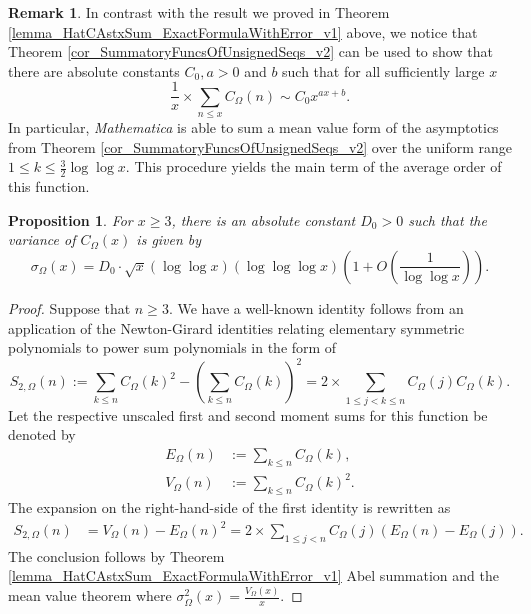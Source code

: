 \documentclass[11pt,reqno,a4letter]{article}
\newcommand{\hlocalref}[1]{\hyperref[#1]{\ref{#1}}}
\numberwithin{equation}{section}
\numberwithin{figure}{section}
\numberwithin{table}{section}
\theoremstyle{plain}
\newtheorem{prop}[theorem]{Proposition}
\numberwithin{theorem}{section}
\theoremstyle{definition}
\newtheorem{remark}[theorem]{Remark}
\begin{document}
\begin{remark}
In contrast with the result we proved in 
Theorem \hlocalref{lemma_HatCAstxSum_ExactFormulaWithError_v1} above, 
we notice that 
Theorem \hlocalref{cor_SummatoryFuncsOfUnsignedSeqs_v2} can be used to show that there are 
absolute constants $C_0,a > 0$ and $b$ such that for all sufficiently large $x$ 
\[
\frac{1}{x} \times \sum_{n \leq x} C_{\Omega}(n) \sim C_0 x^{ax+b}. 
\]
In particular, \emph{Mathematica} is able to sum a mean value form of the 
asymptotics from Theorem \hlocalref{cor_SummatoryFuncsOfUnsignedSeqs_v2} 
over the uniform range $1 \leq k \leq \frac{3}{2} \log\log x$. 
This procedure yields the main term of the average order of this function. 
\end{remark}

\begin{prop}
\label{prop_VarianceStat_for_COmegan_v1}
\label{prop_COmeganFunc_Variance_v1}
For $x \geq 3$, there is an absolute constant $D_0 > 0$ such that the 
variance of $C_{\Omega}(x)$ is given by 
\[
\sigma_{\Omega}(x) = 
	D_0 \cdot \sqrt{x} (\log\log x) (\log\log\log x) \left( 
	1 + O\left(\frac{1}{\log\log x}\right)\right). 
\]
\end{prop}
\begin{proof}
Suppose that $n \geq 3$. 
We have a well-known identity follows from an application of the 
Newton-Girard identities relating elementary symmetric polynomials 
to power sum polynomials in the form of 
\[
S_{2,\Omega}(n) := \sum_{k \leq n} C_{\Omega}(k)^2 - \left(\sum_{k \leq n} C_{\Omega}(k)\right)^2 = 
     2 \times \sum_{1 \leq j < k \leq n} C_{\Omega}(j) C_{\Omega}(k). 
\]
Let the respective unscaled first and second moment sums for this function 
be denoted by 
\begin{align*}
E_{\Omega}(n) & := \sum_{k \leq n} C_{\Omega}(k), \\ 
V_{\Omega}(n) & := \sum_{k \leq n} C_{\Omega}(k)^2. 
\end{align*}
The expansion on the right-hand-side of the first identity is rewritten as 
\begin{align*}
S_{2,\Omega}(n) & = V_{\Omega}(n) - E_{\Omega}(n)^2 = 
     2 \times \sum_{1 \leq j < n} C_{\Omega}(j) \left(
     E_{\Omega}(n) - E_{\Omega}(j)\right). 
\end{align*} 
The conclusion follows by 
Theorem \hlocalref{lemma_HatCAstxSum_ExactFormulaWithError_v1} 
Abel summation and the mean value theorem 
where $\sigma_{\Omega}^2(x) = \frac{V_{\Omega}(x)}{x}$. 
\end{proof}
\end{document}
